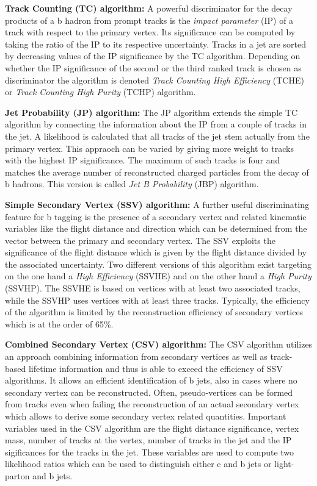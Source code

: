 \begin{description}
 \item \textbf{Track Counting (TC) algorithm:} A powerful discriminator for the decay products of a b hadron from prompt tracks is the \textit{impact parameter} (IP) of a track with respect to the primary vertex. Its significance can be computed by taking the ratio of the IP to its respective uncertainty. Tracks in a jet are sorted by decreasing values of the IP significance by the TC algorithm. Depending on whether the IP significance of the second or the third ranked track is chosen as discriminator the algorithm is denoted \textit{Track Counting High Efficiency} (TCHE) or \textit{Track Counting High Purity} (TCHP) algorithm. 
 \item \textbf{Jet Probability (JP) algorithm:} The JP algorithm extends the simple TC algorithm by connecting the information about the IP from a couple of tracks in the jet. A likelihood is calculated that all tracks of the jet stem actually from the primary vertex. This appraoch can be varied by giving more weight to tracks with the highest IP significance. The maximum of such tracks is four and matches the average number of reconstructed charged particles from the decay of b hadrons. This version is called \textit{Jet B Probability} (JBP) algorithm.
 \item \textbf{Simple Secondary Vertex (SSV) algorithm:} A further useful discriminating feature for b tagging is the presence of a secondary vertex and related kinematic variables like the flight distance and direction which can be determined from the vector between the primary and secondary vertex. The SSV exploits the significance of the flight distance which is given by the flight distance divided by the associated uncertainty. Two different versions of this algorithm exist targeting on the one hand a \textit{High Efficiency} (SSVHE) and on the other hand a \textit{High Purity} (SSVHP). The SSVHE is based on vertices with at least two associated tracks, while the SSVHP uses vertices with at least three tracks. Typically, the efficiency of the algorithm is limited by the reconstruction efficiency of secondary vertices which is at the order of 65\%.   
 \item \textbf{Combined Secondary Vertex (CSV) algorithm:} The CSV algorithm utilizes an approach combining information from secondary vertices as well as track-based lifetime information and thus is able to exceed the efficiency of SSV algorithms. It allows an efficient identification of b jets, also in cases where no secondary vertex can be reconstructed. Often, pseudo-vertices can be formed from tracks even when failing the reconstruction of an actual secondary vertex which allows to derive some secondary vertex related quantities. Important variables used in the CSV algorithm are the flight distance significance, vertex mass, number of tracks at the vertex, number of tracks in the jet and the IP sigificances for the tracks in the jet. These variables are used to compute two likelihood ratios which can be used to distinguish either c and b jets or light-parton and b jets. 
\end{description}  
